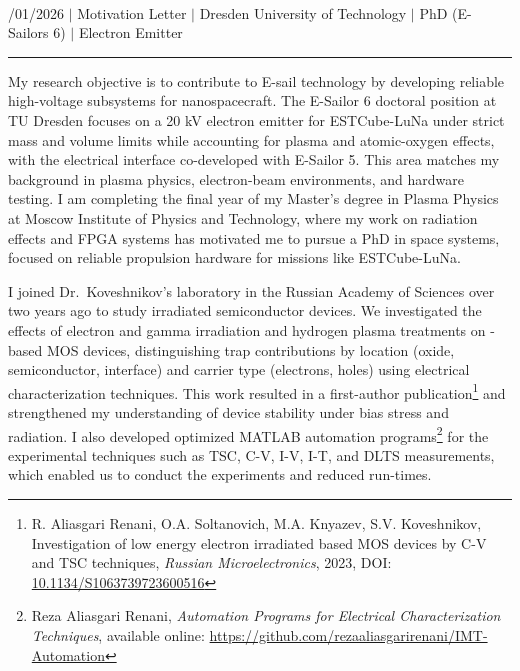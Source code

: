 \documentclass[a4paper,12pt]{article}
\begin{document}
{\centering
  {\scshape {}} \\ 
  {\fontsize{10}{10}/01/2026} $|$
  {\fontsize{10}{10}\selectfont Motivation Letter} $|$
  {\fontsize{10}{10}\selectfont Dresden University of Technology} $|$
  {\fontsize{10}{10}\selectfont PhD (E-Sailors 6)} $|$
  {\fontsize{10}{10}\selectfont Electron Emitter}
\par}
\vspace{-20pt}
\noindent\rule{\textwidth}{0.5pt}

\vspace{-10pt}

My research objective is to contribute to E-sail technology by developing reliable high-voltage subsystems for nanospacecraft. The E-Sailor 6 doctoral position at TU Dresden focuses on a 20 kV electron emitter for ESTCube-LuNa under strict mass and volume limits while accounting for plasma and atomic-oxygen effects, with the electrical interface co-developed with E-Sailor 5. This area matches my background in plasma physics, electron-beam environments, and hardware testing. I am completing the final year of my Master's degree in Plasma Physics at Moscow Institute of Physics and Technology, where my work on radiation effects and FPGA systems has motivated me to pursue a PhD in space systems, focused on reliable propulsion hardware for missions like ESTCube-LuNa.

I joined Dr.\ Koveshnikov's laboratory in the Russian Academy of Sciences over two years ago to study irradiated semiconductor devices. We investigated the effects of electron and gamma irradiation and hydrogen plasma treatments on -based MOS devices, distinguishing trap contributions by location (oxide, semiconductor, interface) and carrier type (electrons, holes) using electrical characterization techniques. This work resulted in a first-author publication\footnote{R. Aliasgari Renani, O.A. Soltanovich, M.A. Knyazev, S.V. Koveshnikov, Investigation of low energy electron irradiated  based MOS devices by C-V and TSC techniques, \textit{Russian Microelectronics}, 2023, DOI: \href{https://doi.org/10.1134/S1063739723600516}{10.1134/S1063739723600516}} and strengthened my understanding of device stability under bias stress and radiation. I also developed optimized MATLAB automation programs\footnote{Reza Aliasgari Renani, \textit{Automation Programs for Electrical Characterization Techniques}, available online: \href{https://github.com/rezaaliasgarirenani/IMT-Automation}{https://github.com/rezaaliasgarirenani/IMT-Automation}} for the experimental techniques such as TSC, C-V, I-V, I-T, and DLTS measurements, which enabled us to conduct the experiments and reduced run-times.
\end{document}
